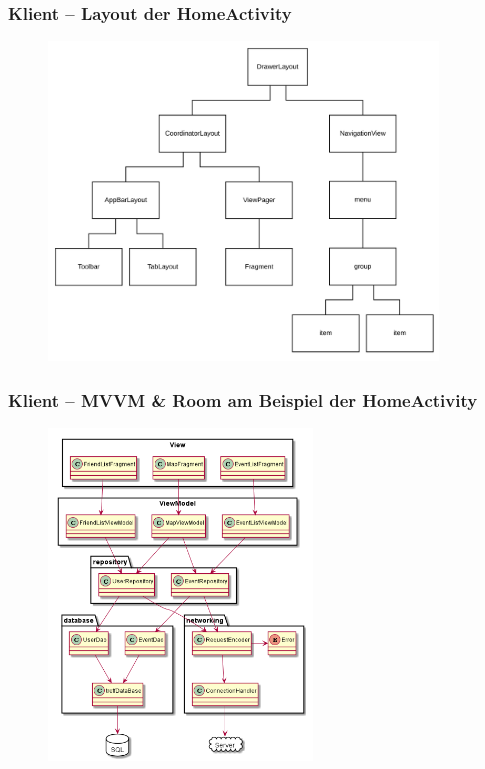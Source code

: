 \documentclass[aspectratio=1610]{beamer}
\begin{document}
    \begin{frame}[plain]
        \frametitle{\textbf{Klient} -- Layout der HomeActivity}
        \begin{figure}[!htb]
            \centering
            \includegraphics[height = 240pt]{images/activity-home-layout.png}
        \end{figure}
    \end{frame}

	\begin{frame}[plain]
        \frametitle{\textbf{Klient} -- MVVM \& Room am Beispiel der HomeActivity}
        \begin{figure}[!htb]
            \centering
            \includegraphics[height = 250pt]{images/database.png}
        \end{figure}
	\end{frame}
\end{document}
